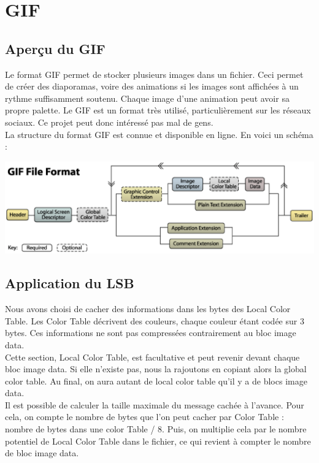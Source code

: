 \section{GIF}

\subsection{Aperçu du GIF}
Le format GIF permet de stocker plusieurs images dans un fichier. 
Ceci permet de créer des diaporamas, voire des animations si les images sont affichées à un rythme suffisamment soutenu. 
Chaque image d'une animation peut avoir sa propre palette.
Le GIF est un format très utilisé, particulièrement sur les réseaux sociaux. 
Ce projet peut donc intéressé pas mal de gens.\\
La structure du format GIF est connue et disponible en ligne. En voici un schéma : 

\vspace{1.5cm}
\includegraphics[width=15cm]{gif_structure.eps}

\vspace{1.5cm}
\subsection{Application du LSB}
Nous avons choisi de cacher des informations dans les bytes des Local Color Table. 
Les Color Table décrivent des couleurs, chaque couleur étant codée sur 3 bytes. 
Ces informations ne sont pas compressées contrairement au bloc image data.\\

Cette section, Local Color Table, est facultative et peut revenir devant chaque bloc image data. 
Si elle n'existe pas, nous la rajoutons en copiant
alors la global color table.
Au final, on aura autant de local color table qu'il y a de blocs image data.\\

Il est possible de calculer la taille maximale du message cachée à l'avance. 
Pour cela, on compte le nombre de bytes que l'on peut cacher par Color Table : nombre de bytes dans une color Table / 8.
Puis, on multiplie cela par le nombre potentiel de Local Color Table dans le fichier, ce qui revient à compter le nombre de bloc image data.

\vspace{1.5cm}

